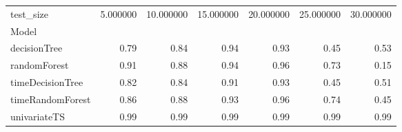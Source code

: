 \begin{tabular}{lrrrrrr}
\toprule
test_size & 5.000000 & 10.000000 & 15.000000 & 20.000000 & 25.000000 & 30.000000 \\
Model &  &  &  &  &  &  \\
\midrule
decisionTree & 0.79 & 0.84 & 0.94 & 0.93 & 0.45 & 0.53 \\
randomForest & 0.91 & 0.88 & 0.94 & 0.96 & 0.73 & 0.15 \\
timeDecisionTree & 0.82 & 0.84 & 0.91 & 0.93 & 0.45 & 0.51 \\
timeRandomForest & 0.86 & 0.88 & 0.93 & 0.96 & 0.74 & 0.45 \\
univariateTS & 0.99 & 0.99 & 0.99 & 0.99 & 0.99 & 0.99 \\
\bottomrule
\end{tabular}
